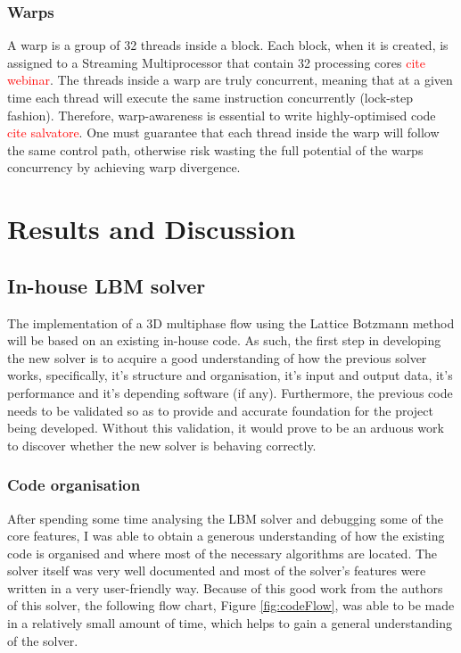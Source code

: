 \documentclass[12pt]{book}
\begin{document}
\subsection{Warps}
A warp is a group of 32 threads inside a block. Each block, when it is created, is assigned to a Streaming Multiprocessor that contain 32 processing cores \textcolor{red}{cite webinar}. The threads inside a warp are truly concurrent, meaning that at a given time each thread will execute the same instruction concurrently (lock-step fashion). Therefore, warp-awareness is essential to write highly-optimised code \textcolor{red}{cite salvatore}. One must guarantee that each thread inside the warp will follow the same control path, otherwise risk wasting the full potential of the warps concurrency by achieving warp divergence.

\chapter{Results and Discussion}
\section{In-house LBM solver}
The implementation of a 3D multiphase flow using the Lattice Botzmann method will be based on an existing in-house code. As such, the first step in developing the new solver is to acquire a good understanding of how the previous solver works, specifically, it’s structure and organisation, it’s input and output data, it’s performance and it’s depending software (if any). Furthermore, the previous code needs to be validated so as to provide and accurate foundation for the project being developed. Without this validation, it would prove to be an arduous work to discover whether the new solver is behaving correctly.
\subsection{Code organisation}
After spending some time analysing the LBM solver and debugging some of the core features, I was able to obtain a generous understanding of how the existing code is organised and where most of the necessary algorithms are located. The solver itself was very well documented and most of the solver’s features were written in a very user-friendly way. Because of this good work from the authors of this solver, the following flow chart, Figure \ref{fig:codeFlow}, was able to be made in a relatively small amount of time, which helps to gain a general understanding of the solver.
\end{document}
